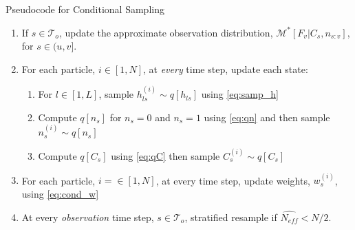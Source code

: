 \begin{table}[h]
\caption{Pseudocode for Conditional Sampling}
\label{tab:back}
\begin{enumerate}
\item If $s \in \mathcal{T}_o$, update the approximate observation distribution, $\mathcal{M}^\ast[F_v | C_s, n_{s:v}]$, for $s \in (u,v]$.
\item For each particle, $i\in[1, N]$, at \emph{every} time step, update each state:
    \begin{enumerate}
    \item For $l\in [1, L]$, sample $h_{ls}^{(i)} \sim q[h_{ls}]$ using \eqref{eq:samp_h}
    \item Compute $q[n_s]$ for $n_s=0$ and $n_s=1$ using \eqref{eq:qn} and then sample $n_s^{(i)} \sim q[n_s]$
    \item Compute $q[C_s]$ using \eqref{eq:qC} then sample $C_s^{(i)} \sim q[C_s]$
    \end{enumerate}
\item For each particle, $i=\in[1,N]$, at every time step, update weights, $w_s^{(i)}$, using \eqref{eq:cond_w}
\item At every \emph{observation} time step, $s \in \mathcal{T}_o$, stratified resample if $\widehat{N_{eff}}<N/2$.
\end{enumerate}
\end{table}

% 